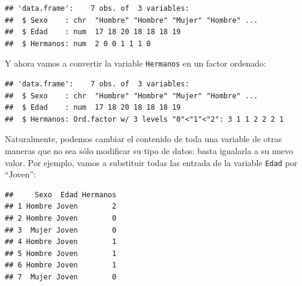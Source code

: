 \documentclass[]{book}
\newenvironment{Shaded}{\begin{snugshade}}{\end{snugshade}}
\newcommand{\DataTypeTok}[1]{\textcolor[rgb]{0.13,0.29,0.53}{#1}}
\newcommand{\DecValTok}[1]{\textcolor[rgb]{0.00,0.00,0.81}{#1}}
\newcommand{\KeywordTok}[1]{\textcolor[rgb]{0.13,0.29,0.53}{\textbf{#1}}}
\newcommand{\NormalTok}[1]{#1}
\newcommand{\OperatorTok}[1]{\textcolor[rgb]{0.81,0.36,0.00}{\textbf{#1}}}
\newcommand{\StringTok}[1]{\textcolor[rgb]{0.31,0.60,0.02}{#1}}
\theoremstyle{definition}
\theoremstyle{definition}
\theoremstyle{definition}
\theoremstyle{remark}
\begin{document}
\begin{Shaded}
\end{Shaded}

\begin{verbatim}
## 'data.frame':    7 obs. of  3 variables:
##  $ Sexo    : chr  "Hombre" "Hombre" "Mujer" "Hombre" ...
##  $ Edad    : num  17 18 20 18 18 18 19
##  $ Hermanos: num  2 0 0 1 1 1 0
\end{verbatim}

Y ahora vamos a convertir la variable \texttt{Hermanos} en un factor ordenado:

\begin{Shaded}
\end{Shaded}

\begin{verbatim}
## 'data.frame':    7 obs. of  3 variables:
##  $ Sexo    : chr  "Hombre" "Hombre" "Mujer" "Hombre" ...
##  $ Edad    : num  17 18 20 18 18 18 19
##  $ Hermanos: Ord.factor w/ 3 levels "0"<"1"<"2": 3 1 1 2 2 2 1
\end{verbatim}

Naturalmente, podemos cambiar el contenido de toda una variable de otras maneras que no sea sólo modificar su tipo de datos: basta igualarla a su nuevo valor. Por ejemplo, vamos a substituir todas las entrada de la variable \texttt{Edad} por ``Joven'':

\begin{Shaded}
\end{Shaded}

\begin{verbatim}
##     Sexo  Edad Hermanos
## 1 Hombre Joven        2
## 2 Hombre Joven        0
## 3  Mujer Joven        0
## 4 Hombre Joven        1
## 5 Hombre Joven        1
## 6 Hombre Joven        1
## 7  Mujer Joven        0
\end{verbatim}
\end{document}
